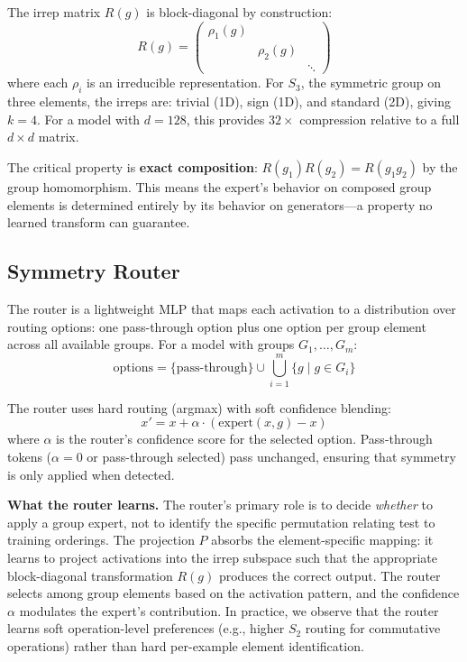 \documentclass[10pt, letterpaper]{article}
\newcommand{\Rg}{R(g)}
\begin{document}
The irrep matrix $\Rg$ is block-diagonal by construction:
\begin{equation}
    \Rg = \begin{pmatrix} \rho_1(g) & & \\ & \rho_2(g) & \\ & & \ddots \end{pmatrix}
\end{equation}
where each $\rho_i$ is an irreducible representation. For $S_3$, the symmetric group on three elements, the irreps are: trivial (1D), sign (1D), and standard (2D), giving $k = 4$. For a model with $d = 128$, this provides $32\times$ compression relative to a full $d \times d$ matrix.

The critical property is \textbf{exact composition}: $R(g_1) R(g_2) = R(g_1 g_2)$ by the group homomorphism. This means the expert's behavior on composed group elements is determined entirely by its behavior on generators---a property no learned transform can guarantee.

\subsection{Symmetry Router}

The router is a lightweight MLP that maps each activation to a distribution over routing options: one pass-through option plus one option per group element across all available groups. For a model with groups $G_1, \ldots, G_m$:
\begin{equation}
    \text{options} = \{{\text{pass-through}}\} \cup \bigcup_{i=1}^{m} \{g \mid g \in G_i\}
\end{equation}

The router uses hard routing (argmax) with soft confidence blending:
\begin{equation}
    x' = x + \alpha \cdot (\text{expert}(x, g) - x)
\end{equation}
where $\alpha$ is the router's confidence score for the selected option. Pass-through tokens ($\alpha = 0$ or pass-through selected) pass unchanged, ensuring that symmetry is only applied when detected.

\textbf{What the router learns.} The router's primary role is to decide \emph{whether} to apply a group expert, not to identify the specific permutation relating test to training orderings. The projection $P$ absorbs the element-specific mapping: it learns to project activations into the irrep subspace such that the appropriate block-diagonal transformation $R(g)$ produces the correct output. The router selects among group elements based on the activation pattern, and the confidence $\alpha$ modulates the expert's contribution. In practice, we observe that the router learns soft operation-level preferences (e.g., higher $S_2$ routing for commutative operations) rather than hard per-example element identification.
\end{document}
